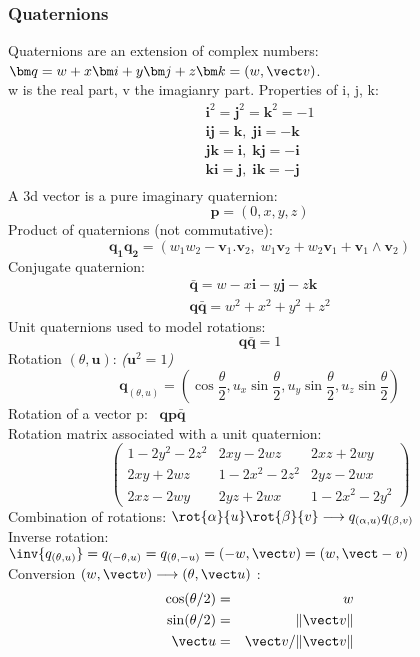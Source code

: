 \subsubsection{Quaternions}
Quaternions are an extension of complex numbers: $ \bm q = w + x\bm i + y \bm j + z \bm k = (w,\vect v)$.\\
w is the real part, \vect v the imagianry part.
Properties of \bm i, \bm j, \bm k:
$$
\begin{array}{l}
  \bm i^2 = \bm j^2 = \bm k^2 = -1\\
  \bm{ij}=\bm k,\;\bm{ji} = -\bm k\\
  \bm{jk}=\bm i,\;\bm{kj} = -\bm i\\
  \bm{ki}=\bm j,\;\bm{ik} = -\bm j\\
\end{array}
$$
A 3d vector is a pure imaginary quaternion:
$$
\bm p = (0,x,y,z)
$$
Product of quaternions (not commutative):
$$
\bm{q_1q_2} = (w_1w_2 - \bm v_1.\bm v_2, \; w_1\bm v_2 + w_2\bm v_1 + \bm v_1 \wedge \bm v_2)
$$
Conjugate quaternion:
$$
\begin{array}{l}
  \bm{\bar q} = w - x\bm i - y \bm j - z \bm k\\
  \bm{q\bar q} = w^2 + x^2 + y^2 + z^2
\end{array}
$$
Unit quaternions used to model rotations:
$$
\bm{q\bar q} = 1
$$
Rotation $(\theta, \bm u)$: {\em ($\bm u^2=1$)}
$$
\bm q_{(\theta,u)} = ( \cos{\frac{\theta}{2}}, u_x\sin{\frac{\theta}{2}}, u_y\sin{\frac{\theta}{2}}, u_z\sin{\frac{\theta}{2}})
$$
Rotation of a vector \bm p:$\;\;\;\bm{ qp\bar{q} }$\\
Rotation matrix associated with a unit quaternion:
$$
\left( \begin{array}{ccc}
  1 - 2y^2 - 2z^2 & 2xy - 2wz & 2xz + 2wy \\
  2xy + 2wz & 1-2x^2-2z^2 & 2yz - 2wx \\
  2xz - 2wy & 2yz + 2wx & 1 - 2x^2 - 2y^2
\end{array} \right)
$$
Combination of rotations: $\rot{\alpha}{u}\rot{\beta}{v} \longrightarrow q_{(\alpha,u)}q_{(\beta,v)}$\\
Inverse rotation: $\inv{ q_{(\theta,u)}} = q_{(-\theta,u)} = q_{(\theta,-u)} = (-w,\vect v) = (w,\vect -v)$ \\
Conversion $(w, \vect v) \longrightarrow ( \theta, \vect u)$ :
\begin{eqnarray*}
\cos(\theta/2) &=& w\\
\sin(\theta/2) &=& \|\vect v\|\\
\vect u &=& \vect v/\|\vect v\|
\end{eqnarray*}

